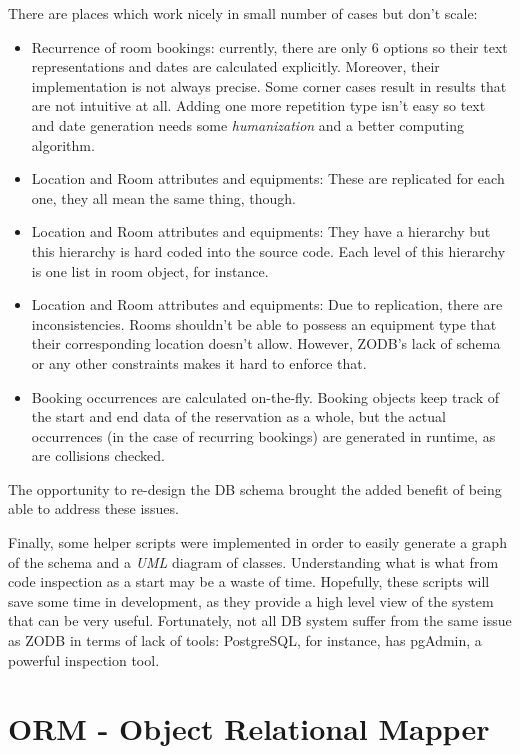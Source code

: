 There are places which work nicely in small number of cases but don't scale:
\begin{itemize}
  \item Recurrence of room bookings: currently, there are only 6 options so their text representations and dates are calculated explicitly. Moreover, their implementation is not always precise. Some corner cases result in results that are not intuitive at all. Adding one more repetition type isn't easy so text and date generation needs some \textit{humanization} and a better computing algorithm.
  \item Location and Room attributes and equipments: These are replicated for each one, they all mean the same thing, though.
  \item Location and Room attributes and equipments: They have a hierarchy but this hierarchy is hard coded into the source code. Each level of this hierarchy is one list in room object, for instance.
  \item Location and Room attributes and equipments: Due to replication, there are inconsistencies. Rooms shouldn't be able to possess an equipment type that their corresponding location doesn't allow. However, ZODB's lack of schema or any other constraints makes it hard to enforce that.
  \item Booking occurrences are calculated on-the-fly. Booking objects keep track of the start and end data of the reservation as a whole, but the actual occurrences (in the case of recurring bookings) are generated in runtime, as are collisions checked.
\end{itemize}

The opportunity to re-design the DB schema brought the added benefit of being able to address these issues.

Finally, some helper scripts were implemented in order to easily generate a graph of the schema and a \textit{UML} diagram of classes. Understanding what is what from code inspection as a start may be a waste of time. Hopefully, these scripts will save some time in development, as they provide a high level view of the system that can be very useful. Fortunately, not all DB system suffer from the same issue as ZODB in terms of lack of tools: PostgreSQL, for instance, has pgAdmin, a powerful inspection tool.

\section{ORM - Object Relational Mapper}

